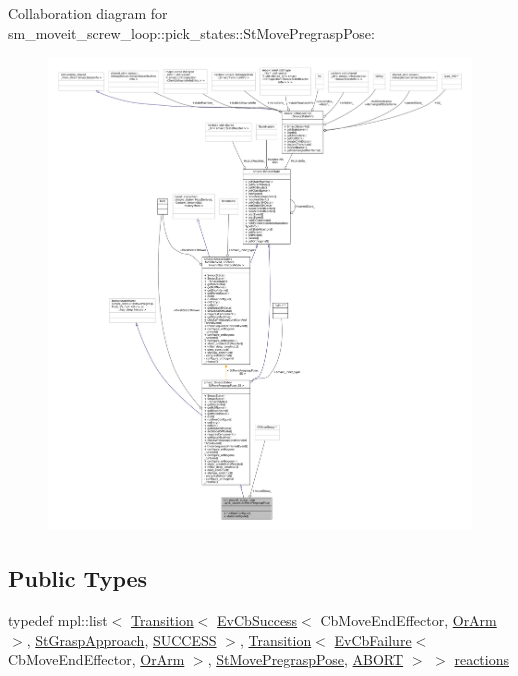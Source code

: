 Collaboration diagram for sm\+\_\+moveit\+\_\+screw\+\_\+loop\+:\+:pick\+\_\+states\+:\+:St\+Move\+Pregrasp\+Pose\+:
\nopagebreak
\begin{figure}[H]
\begin{center}
\leavevmode
\includegraphics[width=350pt]{structsm__moveit__screw__loop_1_1pick__states_1_1StMovePregraspPose__coll__graph}
\end{center}
\end{figure}
\subsection*{Public Types}
\begin{DoxyCompactItemize}
\item 
typedef mpl\+::list$<$ \hyperlink{classsmacc_1_1Transition}{Transition}$<$ \hyperlink{structsmacc_1_1EvCbSuccess}{Ev\+Cb\+Success}$<$ Cb\+Move\+End\+Effector, \hyperlink{classsm__moveit__screw__loop_1_1OrArm}{Or\+Arm} $>$, \hyperlink{structsm__moveit__screw__loop_1_1pick__states_1_1StGraspApproach}{St\+Grasp\+Approach}, \hyperlink{structsmacc_1_1default__transition__tags_1_1SUCCESS}{S\+U\+C\+C\+E\+SS} $>$, \hyperlink{classsmacc_1_1Transition}{Transition}$<$ \hyperlink{structsmacc_1_1EvCbFailure}{Ev\+Cb\+Failure}$<$ Cb\+Move\+End\+Effector, \hyperlink{classsm__moveit__screw__loop_1_1OrArm}{Or\+Arm} $>$, \hyperlink{structsm__moveit__screw__loop_1_1pick__states_1_1StMovePregraspPose}{St\+Move\+Pregrasp\+Pose}, \hyperlink{structsmacc_1_1default__transition__tags_1_1ABORT}{A\+B\+O\+RT} $>$ $>$ \hyperlink{structsm__moveit__screw__loop_1_1pick__states_1_1StMovePregraspPose_a46ddf440f06508aadf4f8e5f6c752681}{reactions}
\end{DoxyCompactItemize}
